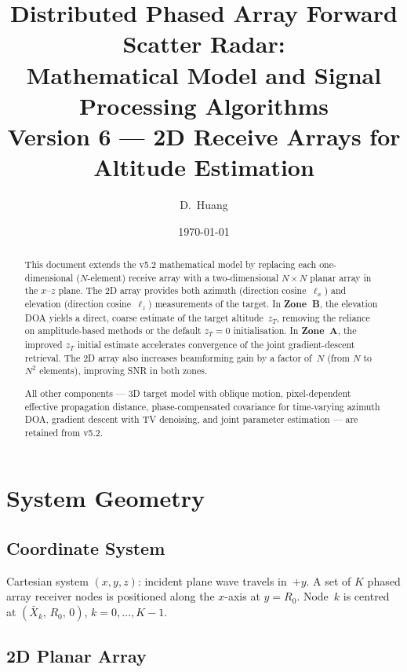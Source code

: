\documentclass[11pt,a4paper]{article}
\title{Distributed Phased Array Forward Scatter Radar:\\
Mathematical Model and Signal Processing Algorithms\\[6pt]
\large Version 6 --- 2D Receive Arrays for Altitude Estimation}
\author{D.~Huang}
\date{\today}
\begin{document}
\maketitle

\begin{abstract}
This document extends the v5.2 mathematical model by replacing each
one-dimensional ($N$-element) receive array with a two-dimensional
$N\times N$ planar array in the $x$--$z$ plane.  The 2D array
provides both azimuth (direction cosine~$\ell_x$) and elevation
(direction cosine~$\ell_z$) measurements of the target.  In
\textbf{Zone~B}, the elevation DOA yields a direct, coarse estimate
of the target altitude~$z_T$, removing the reliance on amplitude-based
methods or the default $z_T{=}0$ initialisation.  In \textbf{Zone~A},
the improved $z_T$ initial estimate accelerates convergence of the
joint gradient-descent retrieval.  The 2D array also increases
beamforming gain by a factor of~$N$ (from $N$ to $N^2$ elements),
improving SNR in both zones.

All other components --- 3D target model with oblique motion,
pixel-dependent effective propagation distance, phase-compensated
covariance for time-varying azimuth DOA, gradient descent with TV
denoising, and joint parameter estimation --- are retained from v5.2.
\end{abstract}

\tableofcontents
\newpage

\section{System Geometry}
\label{sec:geometry}

\subsection{Coordinate System}

Cartesian system $(x,y,z)$: incident plane wave travels in~$+y$.
A set of $K$ phased array receiver nodes is positioned along the
$x$-axis at $y=R_0$.  Node~$k$ is centred at
$(\bar{X}_k,\,R_0,\,0)$, $k=0,\ldots,K{-}1$.

\subsection{2D Planar Array}
\label{sec:2d_array}
\end{document}
